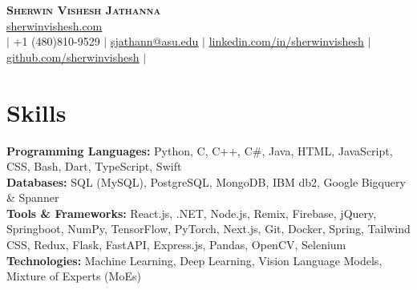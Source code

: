 \documentclass[letterpaper,11pt]{article}
\begin{document}

\begin{center}
    \textbf{\Huge \scshape Sherwin Vishesh Jathanna} \\ \vspace{1pt}
     \href{https://sherwinvishesh.com}{\underline{sherwinvishesh.com}} 
   \\ \small $|$ +1 (480)810-9529 $|$ \href{mailto:sjathann@asu.edu}{\underline{sjathann@asu.edu}} $|$ 
    \href{https://linkedin.com/in/sherwinvishesh}{\underline{linkedin.com/in/sherwinvishesh}} $|$
    \href{https://github.com/sherwinvishesh}{\underline{github.com/sherwinvishesh}} $|$
     \\ 
\end{center}




\section{Skills}
\begin{itemize}[leftmargin=0.15in, label={}]
  \small{\item{

    \textbf{Programming Languages:} Python, C, C++, C\#, Java, HTML, JavaScript, CSS, Bash, Dart, TypeScript, Swift \\
    \textbf{Databases:} SQL (MySQL), PostgreSQL, MongoDB, IBM db2, Google Bigquery \& Spanner \\
\textbf{Tools \& Frameworks:} React.js, .NET, Node.js, Remix, Firebase, jQuery, Springboot, NumPy, TensorFlow, PyTorch, Next.js, Git, Docker, Spring, Tailwind CSS, Redux, Flask, FastAPI, Express.js, Pandas, OpenCV, Selenium \\

    \textbf{Technologies:} Machine Learning, Deep Learning, Vision Language Models, Mixture of Experts (MoEs)
  }}
\end{itemize}

\end{document}
